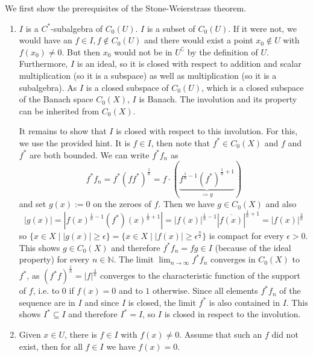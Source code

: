 \documentclass[a4paper]{article}
\begin{document}
We first show the prerequisites of the Stone-Weierstrass theorem.
\begin{enumerate}
    \item $I$ is a $C^*$-subalgebra of $C_0(U)$.
    $I$ is a subset of $C_0(U)$.
    If it were not, we would have an $f \in I, f \notin C_0(U)$ and there would exist a point $x_0 \notin U$ with $f(x_0) \neq 0$.
    But then $x_0$ would not be in $U^\complement$ by the definition of $U$.
    Furthermore, $I$ is an ideal, so it is closed with respect to addition and scalar multiplication (so it is a subspace) as well as multiplication (so it is a subalgebra).
    As $I$ is a closed subspace of $C_0(U)$, which is a closed subspace of the Banach space $C_0(X)$, $I$ is Banach.
    The involution and its property can be inherited from $C_0(X)$.

    It remains to show that $I$ is closed with respect to this involution.
    For this, we use the provided hint.
    It is $f \in I$, then note that $f^* \in C_0(X)$ and $f$ and $f^*$ are both bounded. We can write $f^* f_n$ as
    \begin{equation*}
        f^* f_n = f^* (f f^*)^{\frac{1}{n}} = f \cdot (\underbrace{f^{\frac{1}{n} - 1} (f^*)^{\frac{1}{n} + 1}}_{\coloneq g})
    \end{equation*}
    and set $g(x) := 0$ on the zeroes of $f$. Then we have $g \in C_0(X)$ and also
    \begin{equation*}
        |g(x)| = |f(x)^{\frac{1}{n} - 1} (f^*)(x)^{\frac{1}{n} + 1}| = |f(x)|^{\frac{1}{n} - 1} |\overline{f(x)}|^{\frac{1}{n} + 1} = |f(x)|^{\frac{2}{n}}
    \end{equation*}
    so $\{x \in X \mid |g(x)| \geq \epsilon\} = \{x \in X \mid |f(x)| \geq \epsilon^{\frac{n}{2}}\}$ is compact for every $\epsilon > 0$.
    This shows $g \in C_0(X)$ and therefore $f^* f_n = f g \in I$ (because of the ideal property) for every $n \in \mathds{N}$.
    The limit $\lim_{n \to \infty} f^* f_n$ converges in $C_0(X)$ to $f^*$, as $(f^* f)^{\frac{1}{n}} = |f|^{\frac{2}{n}}$ converges to the characteristic function of the support of $f$, i.e. to $0$ if $f(x) = 0$ and to $1$ otherwise.
    Since all elements $f^* f_n$ of the sequence are in $I$ and since $I$ is closed, the limit $f^*$ is also contained in $I$.
    This shows $I^* \subseteq I$ and therefore $I^* = I$, so $I$ is closed in respect to the involution.
    \item Given $x \in U$, there is $f \in I$ with $f(x) \neq 0$.
    Assume that such an $f$ did not exist, then for all $f \in I$ we have $f(x) = 0$.

\end{enumerate}
\end{document}
